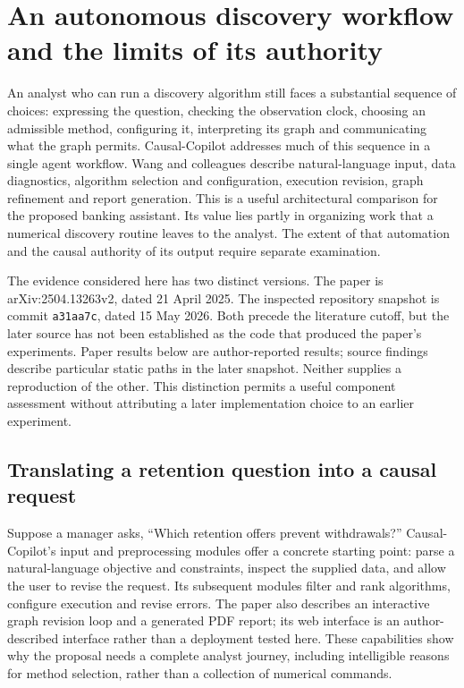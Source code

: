 \section{An autonomous discovery workflow and the limits of its authority}
\label{exec17:copilot-development}

An analyst who can run a discovery algorithm still faces a substantial sequence
of choices: expressing the question, checking the observation clock, choosing
an admissible method, configuring it, interpreting its graph and communicating
what the graph permits. Causal-Copilot addresses much of this sequence in a
single agent workflow. Wang and colleagues describe natural-language input,
data diagnostics, algorithm selection and configuration, execution revision,
graph refinement and report generation. This is a useful architectural
comparison for the proposed banking assistant. Its value lies partly in
organizing work that a numerical discovery routine leaves to the analyst.
The extent of that automation and the causal authority of its output require
separate examination.\citep{exec17_copilot_paper}

The evidence considered here has two distinct versions. The paper is
arXiv:2504.13263v2, dated 21 April 2025. The inspected repository snapshot is
commit \texttt{a31aa7c}, dated 15 May 2026. Both precede the literature cutoff,
but the later source has not been established as the code that produced the
paper's experiments. Paper results below are author-reported results;
source findings describe particular static paths in the later snapshot.
Neither supplies a reproduction of the other. This distinction permits a
useful component assessment without attributing a later implementation choice
to an earlier experiment.\citep{exec17_copilot_paper,exec17_copilot_code}

\subsection{Translating a retention question into a causal request}

Suppose a manager asks, ``Which retention offers prevent withdrawals?''
Causal-Copilot's input and preprocessing modules offer a concrete starting
point: parse a natural-language objective and constraints, inspect the supplied
data, and allow the user to revise the request. Its subsequent modules filter
and rank algorithms, configure execution and revise errors. The paper also
describes an interactive graph revision loop and a generated PDF report;
its web interface is an author-described interface rather than a deployment
tested here. These capabilities show why the proposal needs a complete
analyst journey, including intelligible reasons for method selection, rather
than a collection of numerical commands.\citep{exec17_copilot_paper}

